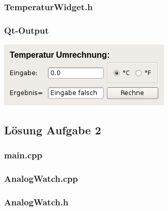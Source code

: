 \subsubsection{TemperaturWidget.h}

\subsubsection{Qt-Output}
\begin{center}
	\includegraphics[scale=.5]{./images/u14a1.png}
\end{center}

\subsection{Lösung Aufgabe 2}
\subsubsection{main.cpp}

\subsubsection{AnalogWatch.cpp}

\subsubsection{AnalogWatch.h}

